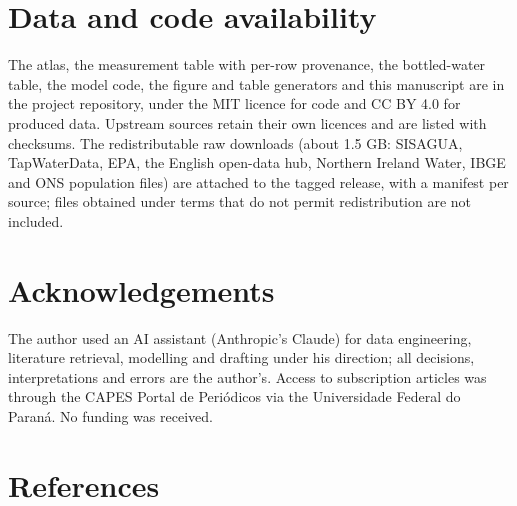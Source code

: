 \documentclass[
  a4paper,
]{article}
\begin{document}
\section{Data and code availability}\label{data-and-code-availability}

The atlas, the measurement table with per-row provenance, the
bottled-water table, the model code, the figure and table generators and
this manuscript are in the project repository, under the MIT licence for
code and CC BY 4.0 for produced data. Upstream sources retain their own
licences and are listed with checksums. The redistributable raw
downloads (about 1.5 GB: SISAGUA, TapWaterData, EPA, the English
open-data hub, Northern Ireland Water, IBGE and ONS population files)
are attached to the tagged release, with a manifest per source; files
obtained under terms that do not permit redistribution are not included.

\section{Acknowledgements}\label{acknowledgements}

The author used an AI assistant (Anthropic's Claude) for data
engineering, literature retrieval, modelling and drafting under his
direction; all decisions, interpretations and errors are the author's.
Access to subscription articles was through the CAPES Portal de
Periódicos via the Universidade Federal do Paraná. No funding was
received.

\section*{References}\label{references}
\end{document}
